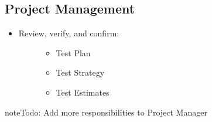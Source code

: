 \documentclass[letterpaper,10pt,english]{sphinxmanual}
\begin{document}
\subsection{Project Management}
\label{\detokenize{test_plan/roles_and_responsibilities:project-management}}
\begin{itemize}
\item {} \begin{description}
\item[{Review, verify, and confirm:}] \leavevmode\begin{itemize}
\item {} 
Test Plan

\item {} 
Test Strategy

\item {} 
Test Estimates

\end{itemize}

\end{description}

\end{itemize}

\begin{sphinxadmonition}{note}{\label{test_plan/roles_and_responsibilities:index-0}Todo:}
Add more responsibilities to Project Manager
\end{sphinxadmonition}
\end{document}

